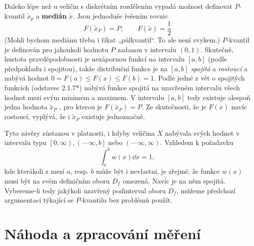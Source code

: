       Daleko lépe než u veličin s diskrétním rozdělením vypadá možnost definovat \(P\)-kvantil 
      \(\tilde{x}_p\) a \textbf{medián} \(\tilde{x}\). Jsou jednoduše řešením rovnic
      \begin{equation*}
        F(\tilde{x}_P) = P, \qquad F(\tilde{x}) = \dfrac{1}{2}
      \end{equation*}
      (Mohli bychom mediánu třeba i říkat „půlkvantil“. To ale není zvykem.) \(P\)-kvantil je 
      definován pro jakoukoli hodnotu \(P\) zadanou v intervalu \((0, 1)\). Skutečně, hustota 
      pravděpodobnosti je nezápornou funkcí na intervalu \([a, b]\) (podle předpokladu i spojitou), 
      takže distribuční funkce je na \([a, b]\) \emph{spojitá} a \emph{rostoucí} a nabývá hodnot 
      \(0 = F(a) \leq F(x) \leq F(b) = 1\). Podle jedné z vět o spojitých funkcích (odstavec 
      2.1.7*) nabývá funkce spojitá na uzavřeném intervalu všech hodnot mezi svým minimem a 
      maximem. V intervalu \([a, b]\) tedy existuje alespoň jedna hodnota \(\tilde{x}_P\) , pro 
      kterou je \(F(\tilde{x}_P) = P\). Ze skutečnosti, že je \(F(x)\) navíc rostoucí, vyplývá, že 
      i \(\tilde{x}_P\) existuje jednoznačně.
  
      Tyto závěry zůstanou v platnosti, i kdyby veličina \(X\) nabývala svých hodnot v intervalu
      typu \(\left[0, \infty\right), \left(—\infty, b\right]\) nebo \((—\infty, \infty)\). Vzhledem 
      k požadavku
      \begin{equation*}
        \int_{a}^{b}w(x)\dd{x} = 1,
      \end{equation*}
      kde kterákoli z mezí \(a\), resp. \(b\) může být i nevlastní, je zřejmé, že funkce \(w(x)\) 
      musí být na svém definičním oboru \(D_f\) omezená. Navíc je na něm spojitá. Vybereme-li tedy 
      jakýkoli uzavřený podinterval oboru \(D_f\), můžeme předchozí argumentaci týkající se 
      \(P\)-kvantilu bez problémů použít.

      
  
      
  
  \section{Náhoda a zpracování měření}

